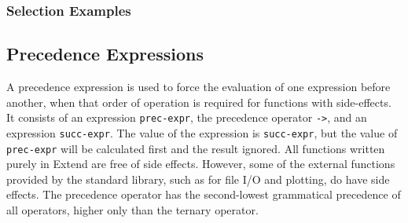 \subsubsection{Selection Examples}

\subsection{Precedence Expressions}
A precedence expression is used to force the evaluation of one expression before another, when that order of operation is required for functions with side-effects. It consists of an expression \texttt{prec-expr}, the precedence operator \texttt{->}, and an expression \texttt{succ-expr}. The value of the expression is \texttt{succ-expr}, but the value of \texttt{prec-expr} will be calculated first and the result ignored. All functions written purely in Extend are free of side effects. However, some of the external functions provided by the standard library, such as for file I/O and plotting, do have side effects. The precedence operator has the second-lowest grammatical precedence of all operators, higher only than the ternary operator.
